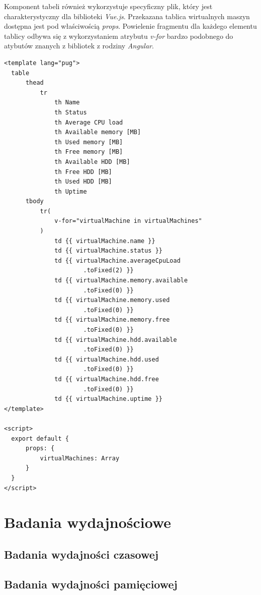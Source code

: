 \documentclass[polish, twoside, 12pt]{mwart}
\let\stdsection\section
\renewcommand*{\section}{\clearpage\stdsection}
\begin{document}
Komponent tabeli również wykorzystuje specyficzny plik, który jest charakterystyczny dla biblioteki \emph{Vue.js}. Przekazana tablica wirtualnych maszyn dostępna jest pod właściwością \emph{props}. Powielenie fragmentu dla każdego elementu tablicy odbywa się z wykorzystaniem atrybutu \emph{v-for} bardzo podobnego do atybutów znanych z bibliotek z rodziny \emph{Angular}.

\begin{lstlisting}[caption=Komponent tabeli]
<template lang="pug">
  table
      thead
          tr
              th Name
              th Status
              th Average CPU load
              th Available memory [MB]
              th Used memory [MB]
              th Free memory [MB]
              th Available HDD [MB]
              th Free HDD [MB]
              th Used HDD [MB]
              th Uptime
      tbody
          tr(
              v-for="virtualMachine in virtualMachines"
          )
              td {{ virtualMachine.name }}
              td {{ virtualMachine.status }}
              td {{ virtualMachine.averageCpuLoad
                      .toFixed(2) }}
              td {{ virtualMachine.memory.available
                      .toFixed(0) }}
              td {{ virtualMachine.memory.used
                      .toFixed(0) }}
              td {{ virtualMachine.memory.free
                      .toFixed(0) }}
              td {{ virtualMachine.hdd.available
                      .toFixed(0) }}
              td {{ virtualMachine.hdd.used
                      .toFixed(0) }}
              td {{ virtualMachine.hdd.free
                      .toFixed(0) }}
              td {{ virtualMachine.uptime }}
</template>

<script>
  export default {
      props: {
          virtualMachines: Array
      }
  }
</script>
\end{lstlisting}

\section{Badania wydajnościowe}

\subsection{Badania wydajności czasowej} 

\subsection{Badania wydajności pamięciowej}
\end{document}
